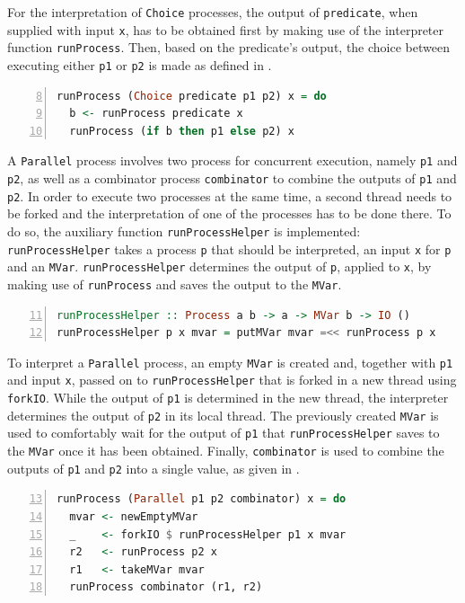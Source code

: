 For the interpretation of \texttt{Choice} processes, the output of \texttt{predicate}, when supplied with input \texttt{x}, has to be obtained first by making use of the interpreter function \texttt{runProcess}. Then, based on the predicate's output, the choice between executing either \texttt{p1} or \texttt{p2} is made as defined in .
\begin{lstlisting}[language=Haskell,caption=Implementation of the interpreter for \texttt{Choice} processes.,label=lst:local_runprocess_choice,numbers=left,frame=bt,firstnumber=8]
runProcess (Choice predicate p1 p2) x = do
  b <- runProcess predicate x
  runProcess (if b then p1 else p2) x
\end{lstlisting}

A \texttt{Parallel} process involves two process for concurrent execution, namely \texttt{p1} and \texttt{p2}, as well as a combinator process \texttt{combinator} to combine the outputs of \texttt{p1} and \texttt{p2}. In order to execute two processes at the same time, a second thread needs to be forked and the interpretation of one of the processes has to be done there. To do so, the auxiliary function \texttt{runProcessHelper} is implemented: \texttt{runProcessHelper} takes a process \texttt{p} that should be interpreted, an input \texttt{x} for \texttt{p} and an \texttt{MVar}. \texttt{runProcessHelper} determines the output of \texttt{p}, applied to \texttt{x}, by making use of \texttt{runProcess} and saves the output to the \texttt{MVar}.
\begin{lstlisting}[language=Haskell,caption=Auxiliary function for the interpretation of \texttt{Parallel} processes.,label=lst:local_runprocesshelper,numbers=left,frame=bt,firstnumber=11]
runProcessHelper :: Process a b -> a -> MVar b -> IO ()
runProcessHelper p x mvar = putMVar mvar =<< runProcess p x
\end{lstlisting}

To interpret a \texttt{Parallel} process, an empty \texttt{MVar} is created and, together with \texttt{p1} and input \texttt{x}, passed on to \texttt{runProcessHelper} that is forked in a new thread using \texttt{forkIO}. While the output of \texttt{p1} is determined in the new thread, the interpreter determines the output of \texttt{p2} in its local thread. The previously created \texttt{MVar} is used to comfortably wait for the output of \texttt{p1} that \texttt{runProcessHelper} saves to the \texttt{MVar} once it has been obtained. Finally, \texttt{combinator} is used to combine the outputs of \texttt{p1} and \texttt{p2} into a single value, as given in .
\begin{lstlisting}[language=Haskell,caption=Implementation of the interpreter for \texttt{Parallel} processes.,numbers=left,frame=bt,label=lst:local_runprocess_parallel,firstnumber=13]
runProcess (Parallel p1 p2 combinator) x = do
  mvar <- newEmptyMVar
  _    <- forkIO $ runProcessHelper p1 x mvar
  r2   <- runProcess p2 x
  r1   <- takeMVar mvar
  runProcess combinator (r1, r2)
\end{lstlisting}

